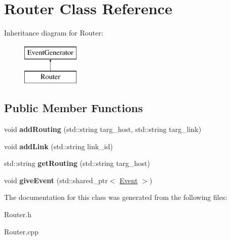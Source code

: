 \hypertarget{classRouter}{\section{\-Router \-Class \-Reference}
\label{classRouter}
}
\-Inheritance diagram for \-Router\-:\begin{figure}[H]
\begin{center}
\leavevmode
\includegraphics[height=2.000000cm]{classRouter}
\end{center}
\end{figure}
\subsection*{\-Public \-Member \-Functions}
\begin{DoxyCompactItemize}
\item 
\hypertarget{classRouter_a0c8e76247f99d1ece5ab8368f30bcb9e}{void {\bfseries add\-Routing} (std\-::string targ\-\_\-host, std\-::string targ\-\_\-link)}\label{classRouter_a0c8e76247f99d1ece5ab8368f30bcb9e}

\item 
\hypertarget{classRouter_a07a2d8e8d3f8f2ce68178afa61bfe00c}{void {\bfseries add\-Link} (std\-::string link\-\_\-id)}\label{classRouter_a07a2d8e8d3f8f2ce68178afa61bfe00c}

\item 
\hypertarget{classRouter_a2c333b431ae61349b91277cda82a3f5e}{std\-::string {\bfseries get\-Routing} (std\-::string targ\-\_\-host)}\label{classRouter_a2c333b431ae61349b91277cda82a3f5e}

\item 
\hypertarget{classRouter_aed4bdd88f4fa09cb784c5c329c935688}{void {\bfseries give\-Event} (std\-::shared\-\_\-ptr$<$ \hyperlink{classEvent}{\-Event} $>$)}\label{classRouter_aed4bdd88f4fa09cb784c5c329c935688}

\end{DoxyCompactItemize}


\-The documentation for this class was generated from the following files\-:\begin{DoxyCompactItemize}
\item 
\-Router.\-h\item 
\-Router.\-cpp\end{DoxyCompactItemize}
